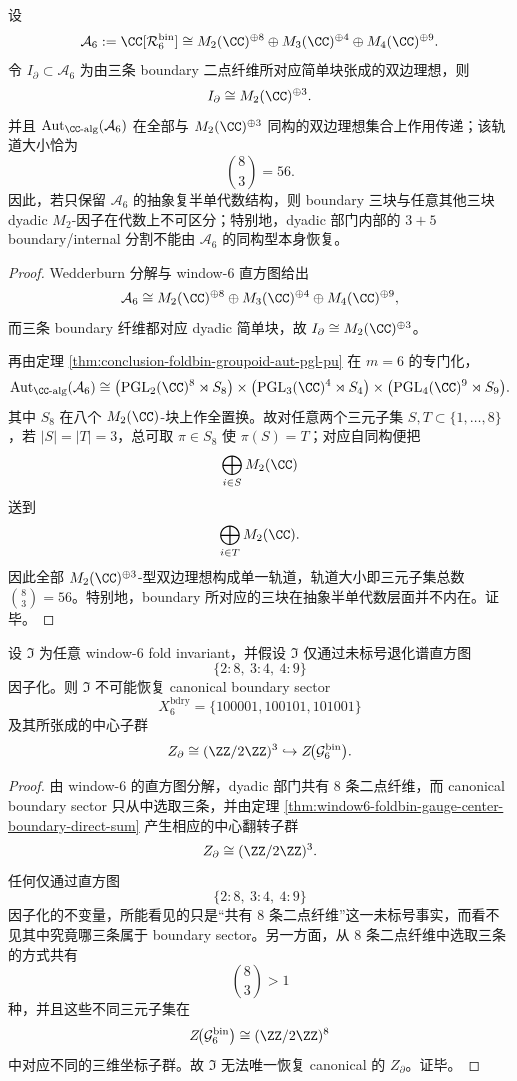 \begin{theorem}\label{thm:conclusion-window6-semisimple-boundary-forgetfulness}
设
\[
\mathcal A_6:=\CC[\mathcal R_6^{\mathrm{bin}}]
\cong
M_2(\CC)^{\oplus 8}\oplus M_3(\CC)^{\oplus 4}\oplus M_4(\CC)^{\oplus 9}.
\]
令 \(I_{\partial}\subset \mathcal A_6\) 为由三条 boundary 二点纤维所对应简单块张成的双边理想，则
\[
I_{\partial}\cong M_2(\CC)^{\oplus 3}.
\]
并且 \(\mathrm{Aut}_{\CC\text{-alg}}(\mathcal A_6)\) 在全部与 \(M_2(\CC)^{\oplus 3}\) 同构的双边理想集合上作用传递；该轨道大小恰为
\[
\binom{8}{3}=56.
\]
因此，若只保留 \(\mathcal A_6\) 的抽象复半单代数结构，则 boundary 三块与任意其他三块 dyadic \(M_2\)-因子在代数上不可区分；特别地，dyadic 部门内部的 \(3+5\) boundary/internal 分割不能由 \(\mathcal A_6\) 的同构型本身恢复。
\end{theorem}
\begin{proof}
Wedderburn 分解与 window-\(6\) 直方图给出
\[
\mathcal A_6
\cong
M_2(\CC)^{\oplus 8}\oplus M_3(\CC)^{\oplus 4}\oplus M_4(\CC)^{\oplus 9},
\]
而三条 boundary 纤维都对应 dyadic 简单块，故 \(I_{\partial}\cong M_2(\CC)^{\oplus 3}\)。

再由定理 \ref{thm:conclusion-foldbin-groupoid-aut-pgl-pu} 在 \(m=6\) 的专门化，
\[
\mathrm{Aut}_{\CC\text{-alg}}(\mathcal A_6)
\cong
\bigl(\operatorname{PGL}_2(\CC)^8\rtimes S_8\bigr)
\times
\bigl(\operatorname{PGL}_3(\CC)^4\rtimes S_4\bigr)
\times
\bigl(\operatorname{PGL}_4(\CC)^9\rtimes S_9\bigr).
\]
其中 \(S_8\) 在八个 \(M_2(\CC)\)-块上作全置换。故对任意两个三元子集 \(S,T\subset\{1,\dots,8\}\)，若 \(|S|=|T|=3\)，总可取 \(\pi\in S_8\) 使 \(\pi(S)=T\)；对应自同构便把
\[
\bigoplus_{i\in S} M_2(\CC)
\]
送到
\[
\bigoplus_{i\in T} M_2(\CC).
\]
因此全部 \(M_2(\CC)^{\oplus 3}\)-型双边理想构成单一轨道，轨道大小即三元子集总数 \(\binom{8}{3}=56\)。特别地，boundary 所对应的三块在抽象半单代数层面并不内在。证毕。
\end{proof}

\begin{theorem}\label{thm:conclusion-window6-boundary-parity-histogram-nonrecoverability}
设 \(\mathfrak I\) 为任意 window-\(6\) fold invariant，并假设 \(\mathfrak I\) 仅通过未标号退化谱直方图
\[
\{2:8,\ 3:4,\ 4:9\}
\]
因子化。则 \(\mathfrak I\) 不可能恢复 canonical boundary sector
\[
X_6^{\mathrm{bdry}}=\{100001,100101,101001\}
\]
及其所张成的中心子群
\[
Z_{\partial}\cong (\ZZ/2\ZZ)^3\hookrightarrow Z\!\bigl(\mathcal G_6^{\mathrm{bin}}\bigr).
\]
\end{theorem}
\begin{proof}
由 window-\(6\) 的直方图分解，dyadic 部门共有 \(8\) 条二点纤维，而 canonical boundary sector 只从中选取三条，并由定理 \ref{thm:window6-foldbin-gauge-center-boundary-direct-sum} 产生相应的中心翻转子群
\[
Z_{\partial}\cong (\ZZ/2\ZZ)^3.
\]
任何仅通过直方图
\[
\{2:8,\ 3:4,\ 4:9\}
\]
因子化的不变量，所能看见的只是“共有 \(8\) 条二点纤维”这一未标号事实，而看不见其中究竟哪三条属于 boundary sector。另一方面，从 \(8\) 条二点纤维中选取三条的方式共有
\[
\binom{8}{3}>1
\]
种，并且这些不同三元子集在
\[
Z\!\bigl(\mathcal G_6^{\mathrm{bin}}\bigr)\cong (\ZZ/2\ZZ)^8
\]
中对应不同的三维坐标子群。故 \(\mathfrak I\) 无法唯一恢复 canonical 的 \(Z_{\partial}\)。证毕。
\end{proof}

